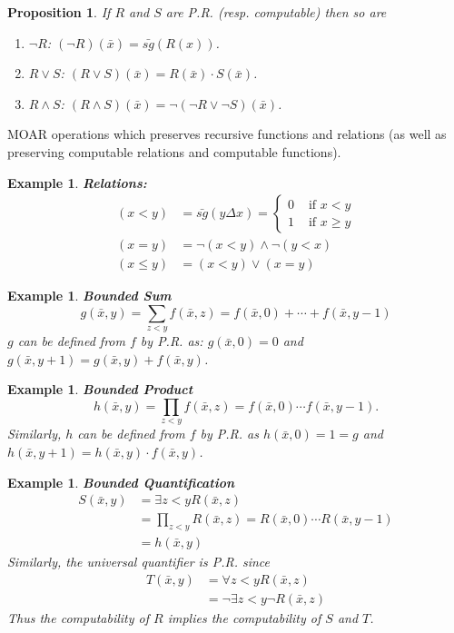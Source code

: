 \documentclass[twoside]{article}
\newtheorem{proposition}[theorem]{Proposition}
\newtheorem{example}[theorem]{Example}
\begin{document}
\begin{proposition}
If $R$ and $S$ are P.R. (resp. computable) then so are
\begin{enumerate}
\item $\lnot R$: $(\lnot R)(\bar{x}) = \bar{sg}(R(x))$.
\item $R \lor S$: $(R \lor S)(\bar{x}) = R(\bar{x}) \cdot S(\bar{x})$.
\item $R \land S$: $(R \land S)(\bar{x}) = \lnot(\lnot R \lor \lnot S)(\bar{x})$.
\end{enumerate}
\end{proposition}

MOAR operations which preserves recursive functions and relations (as well as preserving computable relations and computable functions).

\begin{example}
\textbf{Relations:}
\begin{align*}
(x < y) &= \bar{sg}\left(y \Delta x\right) = \begin{cases} 
			0 &\mbox{ if } x < y \\
			1 &\mbox{ if } x \geq y
		\end{cases} \\
(x = y) &= \lnot (x < y) \land \lnot (y < x) \\
(x \leq y) &= (x < y) \lor (x = y) 
\end{align*}
\end{example}

\begin{example}
\textbf{Bounded Sum}
\[g(\bar{x}, y) = \sum_{z < y}f(\bar{x}, z) = f(\bar{x}, 0) + \cdots + f(\bar{x}, y-1)\]
$g$ can be defined from $f$ by P.R. as: $g(\bar{x}, 0) = 0$ and $g(\bar{x}, y+1) = g(\bar{x}, y) + f(\bar{x},y)$.
\end{example}

\begin{example}
\textbf{Bounded Product}
\[h(\bar{x},y) = \prod_{z<y} f(\bar{x},z) = f(\bar{x},0) \cdots f(\bar{x},y-1).\]
Similarly, $h$ can be defined from $f$ by P.R. as $h(\bar{x}, 0) = 1 = g$ and $h(\bar{x}, y+1) = h(\bar{x},y) \cdot f(\bar{x}, y)$.
\end{example}

\begin{example}
\textbf{Bounded Quantification}
\begin{align*}
S(\bar{x},y) &= \exists z< y R(\bar{x}, z) \\
&= \prod_{z < y} R(\bar{x}, z) = R(\bar{x}, 0) \cdots R(\bar{x}, y-1) \\
&= h(\bar{x}, y)
\end{align*}
Similarly, the universal quantifier is P.R. since
\begin{align*}
T(\bar{x}, y) &= \forall z < y R(\bar{x},z) \\
&= \lnot \exists z < y \lnot R(\bar{x},z)
\end{align*}
Thus the computability of $R$ implies the computability of $S$ and $T$.
\end{example}
\end{document}

